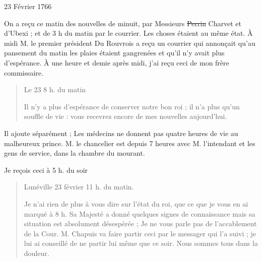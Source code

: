                     \begin{diary}{23 Février 1766}{}

                         On a reçu ce matin des nouvelles de
                              minuit,
                           par Messieurs
                           \sout{Perrin} Charvet et d'Ubexi ; et de 3 h
                              du matin par le courrier. Les choses étaient au même état. À
                           midi M. le premier président
                              Du Rouvrois a reçu un courrier qui
                           annonçait qu'au pansement du matin
                           les plaies étaient gangrenées et qu'il n'y
                           avait plus d'espérance. À une
                              heure
                              et demie après midi, j'ai reçu ceci
                           de mon frère commissaire. \bigskip


                        \begin{quote}\begin{flushright}Le 23 8 h. du
                                 matin\end{flushright}
                              Il n'y a plus d'espérance de conserver
                              notre bon roi ; il n'a
                              plus qu'un souffle
                              de vie : vous recevrez encore de mes
                              nouvelles aujourd'hui. \bigskip

        \end{quote}
                         Il ajoute séparément ; \og
                              Les médecins ne donnent pas quatre heures
                              de vie au malheureux
                                 prince. M. le
                                 chancelier est depuis 7 heures avec M.
                                 l'intendant et les gens de service, dans
                              la chambre du mourant.  \fg{}
                        \bigskip


                         Je reçois ceci à 5 h. du soir \bigskip


                        \begin{quote}\begin{flushright}
                              Lunéville
                              23 février 11 h. du matin.\end{flushright}
                              Je n'ai rien de plus à vous dire sur l'état du roi,
                              que ce que je vous en ai marqué à 8 h. Sa Majesté
                              a donné quelques signes de connaissance
                              mais sa situation est absolument désespérée ;
                              Je ne vous parle pas de l'accablement de la
                              Cour. M. Chapuis va faire partir ceci
                              par le messager qui l'a suivi ; je lui ai conseillé de ne partir lui même
                              que ce soir.
                              Nous sommes tous dans la douleur. \bigskip


\end{quote}
\end{diary}
